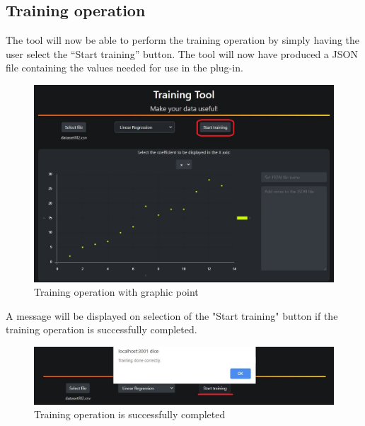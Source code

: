 \subsection{Training operation}
The tool will now be able to perform the training operation by simply  having the user select the “Start training” button. The tool will now have produced a JSON file containing the values needed for use in the plug-in.
\begin{figure}[H]
\centering
\includegraphics[scale=0.65]{img/tool/screen_3_1_tool.JPG}
\caption{Training operation with graphic point}
\end{figure}

A message will be displayed on selection of the "Start training" button if the training operation is successfully completed.
\newline
\begin{figure}[H]
\centering
\includegraphics[scale=0.65]{img/tool/screen_4_1_tool.JPG}
\caption{Training operation is successfully completed}
\end{figure}  
\newpage
